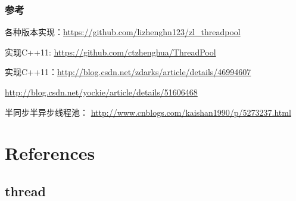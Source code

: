 \documentclass[UTF8,a4paper,12pt]{ctexbook}
\begin{document}
			
		\subsubsection{参考}
			各种版本实现：\url{https://github.com/lizhenghn123/zl_threadpool}
			
			实现C++11: \url{https://github.com/ctzhenghua/ThreadPool}
			
			实现C++11：\url{http://blog.csdn.net/zdarks/article/details/46994607}
			
			\url{http://blog.csdn.net/yockie/article/details/51606468}
			
			半同步半异步线程池： \url{http://www.cnblogs.com/kaishan1990/p/5273237.html}
\section{References}
	\subsection{thread}
\end{document}
